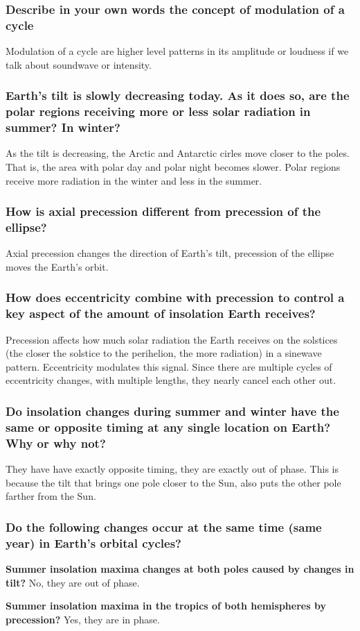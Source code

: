 \subsubsection{Describe in your own words the concept of modulation of a cycle}
Modulation of a cycle are higher level patterns in its amplitude or loudness
if we talk about soundwave or intensity.

\subsubsection{Earth's tilt is slowly decreasing today. As it does so, are the
polar regions receiving more or less solar radiation in summer? In winter?}
As the tilt is decreasing, the Arctic and Antarctic cirles move closer to the
poles. That is, the area with polar day and polar night becomes slower. Polar
regions receive more radiation in the winter and less in the summer.

\subsubsection{How is axial precession different from precession of the
ellipse?}
Axial precession changes the direction of Earth's tilt, precession of the
ellipse moves the Earth's orbit.

\subsubsection{How does eccentricity combine with precession to control a key
aspect of the amount of insolation Earth receives?}
Precession affects how much solar radiation the Earth receives on the
solstices (the closer the solstice to the perihelion, the more radiation) in
a sinewave pattern. Eccentricity modulates this signal.
Since there are multiple cycles of eccentricity changes, with multiple lengths,
they nearly cancel each other out.

\subsubsection{Do insolation changes during summer and winter have the same or
opposite timing at any single location on Earth? Why or why not?}
They have have exactly opposite timing, they are exactly out of phase. This is
because the tilt that brings one pole closer to the Sun, also puts the other
pole farther from the Sun.

\subsubsection{Do the following changes occur at the same time (same year) in
Earth's orbital cycles?}

\textbf{Summer insolation maxima changes at both poles caused by changes in
tilt?}
No, they are out of phase.

\textbf{Summer insolation maxima in the tropics of both hemispheres by
precession?}
Yes, they are in phase.
